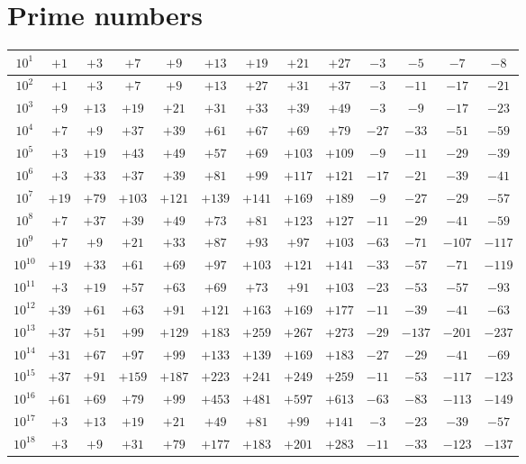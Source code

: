 \documentclass{article}
\begin{document}

\section*{Prime numbers}

\begin{tabular}{|c|c|c|c|c|c|c|c|c|c|c|c|c|}
\hline
$10^{1}$ & $+1$ & $+3$ & $+7$ & $+9$ & $+13$ & $+19$ & $+21$ & $+27$ & $-3$ & $-5$ & $-7$ & $-8$ \\
\hline
$10^{2}$ & $+1$ & $+3$ & $+7$ & $+9$ & $+13$ & $+27$ & $+31$ & $+37$ & $-3$ & $-11$ & $-17$ & $-21$ \\
\hline
$10^{3}$ & $+9$ & $+13$ & $+19$ & $+21$ & $+31$ & $+33$ & $+39$ & $+49$ & $-3$ & $-9$ & $-17$ & $-23$ \\
\hline
$10^{4}$ & $+7$ & $+9$ & $+37$ & $+39$ & $+61$ & $+67$ & $+69$ & $+79$ & $-27$ & $-33$ & $-51$ & $-59$ \\
\hline
$10^{5}$ & $+3$ & $+19$ & $+43$ & $+49$ & $+57$ & $+69$ & $+103$ & $+109$ & $-9$ & $-11$ & $-29$ & $-39$ \\
\hline
$10^{6}$ & $+3$ & $+33$ & $+37$ & $+39$ & $+81$ & $+99$ & $+117$ & $+121$ & $-17$ & $-21$ & $-39$ & $-41$ \\
\hline
$10^{7}$ & $+19$ & $+79$ & $+103$ & $+121$ & $+139$ & $+141$ & $+169$ & $+189$ & $-9$ & $-27$ & $-29$ & $-57$ \\
\hline
$10^{8}$ & $+7$ & $+37$ & $+39$ & $+49$ & $+73$ & $+81$ & $+123$ & $+127$ & $-11$ & $-29$ & $-41$ & $-59$ \\
\hline
$10^{9}$ & $+7$ & $+9$ & $+21$ & $+33$ & $+87$ & $+93$ & $+97$ & $+103$ & $-63$ & $-71$ & $-107$ & $-117$ \\
\hline
$10^{10}$ & $+19$ & $+33$ & $+61$ & $+69$ & $+97$ & $+103$ & $+121$ & $+141$ & $-33$ & $-57$ & $-71$ & $-119$ \\
\hline
$10^{11}$ & $+3$ & $+19$ & $+57$ & $+63$ & $+69$ & $+73$ & $+91$ & $+103$ & $-23$ & $-53$ & $-57$ & $-93$ \\
\hline
$10^{12}$ & $+39$ & $+61$ & $+63$ & $+91$ & $+121$ & $+163$ & $+169$ & $+177$ & $-11$ & $-39$ & $-41$ & $-63$ \\
\hline
$10^{13}$ & $+37$ & $+51$ & $+99$ & $+129$ & $+183$ & $+259$ & $+267$ & $+273$ & $-29$ & $-137$ & $-201$ & $-237$ \\
\hline
$10^{14}$ & $+31$ & $+67$ & $+97$ & $+99$ & $+133$ & $+139$ & $+169$ & $+183$ & $-27$ & $-29$ & $-41$ & $-69$ \\
\hline
$10^{15}$ & $+37$ & $+91$ & $+159$ & $+187$ & $+223$ & $+241$ & $+249$ & $+259$ & $-11$ & $-53$ & $-117$ & $-123$ \\
\hline
$10^{16}$ & $+61$ & $+69$ & $+79$ & $+99$ & $+453$ & $+481$ & $+597$ & $+613$ & $-63$ & $-83$ & $-113$ & $-149$ \\
\hline
$10^{17}$ & $+3$ & $+13$ & $+19$ & $+21$ & $+49$ & $+81$ & $+99$ & $+141$ & $-3$ & $-23$ & $-39$ & $-57$ \\
\hline
$10^{18}$ & $+3$ & $+9$ & $+31$ & $+79$ & $+177$ & $+183$ & $+201$ & $+283$ & $-11$ & $-33$ & $-123$ & $-137$ \\
\hline
\end{tabular}
\end{document}
